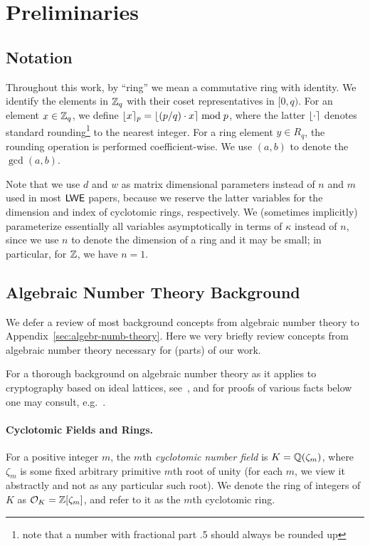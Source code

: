 \section{Preliminaries}
\label{sec:prelims}

\subsection{Notation}
\label{sec:notation}
Throughout this work, by ``ring'' we mean a commutative ring with
identity.  We identify the elements in $\mathbb{Z}_q$ with their coset
representatives in $[0,q)$. For an element $x \in \mathbb{Z}_q$, 
we define 
$\lfloor x\rceil_{p} =\lfloor(p/q) \cdot x\rceil \bmod{p}$,
where the latter $\lfloor\cdot\rceil$ denotes standard
rounding\footnote{note that a number with fractional part .5 should
  always be rounded up} to the
nearest integer. For a ring element $y \in R_q$, the rounding
operation is performed coefficient-wise. We use $(a,b)$ to denote the $\gcd(a,b)$.

Note that we use $d$ and $w$ as matrix dimensional parameters instead
of $n$ and $m$ used in most $\mathsf{LWE}$ papers, because we reserve the
latter variables for the dimension and index of cyclotomic rings,
respectively.  We (sometimes implicitly) parameterize essentially all
variables asymptotically in terms of $\kappa$ instead of $n$, since we
use $n$ to denote the dimension of a ring and it may be small; in
particular, for $\mathbb{Z}$, we have $n=1$.
\subsection{Algebraic Number Theory Background}
\label{sec:algnum-theory}
\iflncs
We defer a review of most background
concepts from algebraic number theory to Appendix~\ref{sec:algebr-numb-theory}.
\else
Here we very briefly review concepts from algebraic number theory necessary
for (parts) of our work. 

For a thorough background on algebraic
number theory as it applies to cryptography based on ideal lattices,
see~\cite{DBLP:journals/jacm/LyubashevskyPR13,DBLP:conf/eurocrypt/LyubashevskyPR13},
and for proofs of various facts below one may consult, e.g.~\cite{samuel70}.


\paragraph{Cyclotomic Fields and Rings.}
For a positive integer $m$, the $m$th
\emph{cyclotomic number field} is $K=\mathbb{Q}(\zeta_{m})$, where $\zeta_m$ is some fixed arbitrary primitive $m$th root of unity (for each $m$,
we view it abstractly and not as any particular such root).  We denote
the ring of integers of $K$ as $\mathcal{O}_{K} = \mathbb{Z}[\zeta_{m}]$, and refer to
it as the $m$th cyclotomic ring. 

